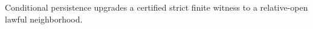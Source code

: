 Conditional persistence upgrades a certified strict finite witness to a relative-open lawful neighborhood.